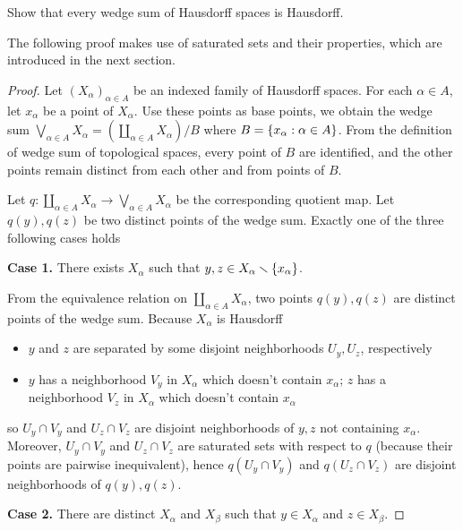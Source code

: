\begin{exercise}{3.55}
    Show that every wedge sum of Hausdorff spaces is Hausdorff.
\end{exercise}

The following proof makes use of saturated sets and their properties, which are introduced in the next section.

\begin{proof}
    Let ${(X_{\alpha})}_{\alpha\in A}$ be an indexed family of Hausdorff spaces. For each $\alpha\in A$, let $x_{\alpha}$ be a point of $X_{\alpha}$. Use these points as base points, we obtain the wedge sum $\bigvee_{\alpha\in A}X_{\alpha} = \left(\coprod_{\alpha\in A}X_{\alpha}\right)/B$ where $B = \left\{{ x_{\alpha} : \alpha\in A }\right\}$. From the definition of wedge sum of topological spaces, every point of $B$ are identified, and the other points remain distinct from each other and from points of $B$.

    Let $q: \coprod_{\alpha\in A}X_{\alpha}\to \bigvee_{\alpha\in A}X_{\alpha}$ be the corresponding quotient map. Let $q(y), q(z)$ be two distinct points of the wedge sum. Exactly one of the three following cases holds

    \textbf{Case 1.} There exists $X_{\alpha}$ such that $y, z \in X_{\alpha}\smallsetminus\left\{{x_{\alpha}}\right\}$.

    From the equivalence relation on $\coprod_{\alpha\in A}X_{\alpha}$, two points $q(y), q(z)$ are distinct points of the wedge sum. Because $X_{\alpha}$ is Hausdorff
    \begin{itemize}
        \item $y$ and $z$ are separated by some disjoint neighborhoods $U_{y}, U_{z}$, respectively
        \item $y$ has a neighborhood $V_{y}$ in $X_{\alpha}$ which doesn't contain $x_{\alpha}$; $z$ has a neighborhood $V_{z}$ in $X_{\alpha}$ which doesn't contain $x_{\alpha}$
    \end{itemize}

    so $U_{y}\cap V_{y}$ and $U_{z}\cap V_{z}$ are disjoint neighborhoods of $y, z$ not containing $x_{\alpha}$. Moreover, $U_{y}\cap V_{y}$ and $U_{z}\cap V_{z}$ are saturated sets with respect to $q$ (because their points are pairwise inequivalent), hence $q(U_{y}\cap V_{y})$ and $q(U_{z}\cap V_{z})$ are disjoint neighborhoods of $q(y), q(z)$.

    \textbf{Case 2.} There are distinct $X_{\alpha}$ and $X_{\beta}$ such that $y\in X_{\alpha}$ and $z\in X_{\beta}$.


\end{proof}
